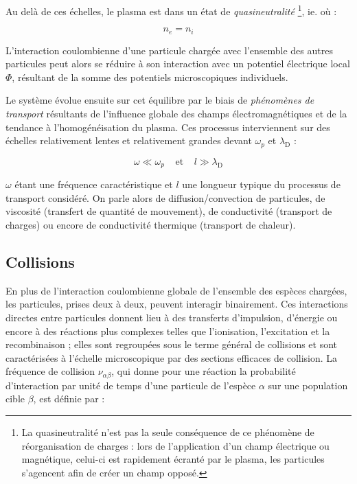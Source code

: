 \begin{refsection}
Au delà de ces échelles, le plasma est dans un état de \emph{quasineutralité}
\footnote{La quasineutralité n'est pas la seule conséquence de ce phénomène de
réorganisation de charges : lors de l'application d'un champ électrique ou magnétique, celui-ci est rapidement
écranté par le plasma, les particules s'agencent afin de créer un champ
opposé.}, ie. où :

\begin{equation}
n_e=n_i
\label{quasineutralité}
\end{equation}

L'interaction coulombienne d'une particule chargée avec l'ensemble des autres particules peut alors
se réduire à son interaction avec un potentiel électrique local $\Phi$,
résultant de la somme des potentiels microscopiques individuels.

Le système évolue ensuite sur cet équilibre par le biais de
\emph{phénomènes de transport} résultants de l'influence
globale des champs électromagnétiques et de la tendance à
l'homogénéisation du plasma.
Ces processus interviennent sur des échelles relativement
lentes et relativement grandes devant $\omega_{p}$ et $\lambda_\text{D}$ :

\begin{equation}
\omega\ll \omega_{p}
\;\;\;\;\text{et}\;\;\;\;l\gg\lambda_\text{D}
\end{equation}

$\omega$ étant une fréquence caractéristique et $l$ une longueur typique
du processus de transport considéré.
On parle alors de diffusion/convection de particules, de viscosité (transfert de
quantité de mouvement), de conductivité (transport de charges) ou encore de
conductivité thermique (transport de chaleur).

\subsection{Collisions}
\label{1-Collisions}
En plus de l'interaction coulombienne globale de l'ensemble des espèces chargées, 
les particules, prises deux à deux, peuvent interagir binairement. 
Ces interactions directes entre particules donnent lieu à des transferts
d'impulsion, d'énergie ou encore à des réactions plus complexes telles que
l'ionisation, l'excitation et la recombinaison ; elles sont regroupées
sous le terme général de collisions et sont caractérisées à l'échelle
microscopique par des sections efficaces de collision. La fréquence de
collision $\nu_{\alpha \beta}$, qui donne pour une réaction la probabilité
d'interaction par unité de temps d'une particule de l'espèce $\alpha$ sur une
population cible $\beta$, est définie par :


\end{refsection}
